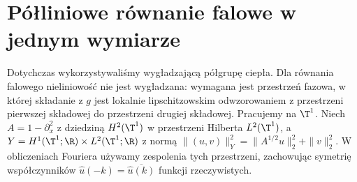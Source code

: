 \section{Półliniowe równanie falowe w jednym wymiarze}
Dotychczas wykorzystywaliśmy wygładzającą półgrupę ciepła.
Dla równania falowego nieliniowość nie jest wygładzana:
wymagana jest przestrzeń fazowa, w której składanie
z $g$ jest lokalnie lipschitzowskim odwzorowaniem
z przestrzeni pierwszej składowej do przestrzeni
drugiej składowej. Pracujemy na $\T^1$.
Niech $A=1-\partial_x^2$ z dziedziną $H^2(\T^1)$
w przestrzeni Hilberta $L^2(\T^1)$, a
$Y=H^1(\T^1;\R)\times L^2(\T^1;\R)$ z normą
$\|(u,v)\|_Y^2=\|A^{1/2}u\|_2^2+\|v\|_2^2$.
W obliczeniach Fouriera używamy zespolenia tych
przestrzeni, zachowując symetrię współczynników
$\widehat u(-k)=\overline{\widehat u(k)}$
funkcji rzeczywistych.


